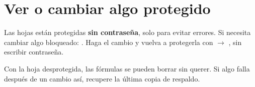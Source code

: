 \section{Ver o cambiar algo protegido}
Las hojas están protegidas \textbf{sin contraseña}, solo para evitar errores. Si necesita cambiar algo bloqueado:
. Haga el cambio y vuelva a protegerla con 
$\rightarrow$ , sin escribir contraseña.

\begin{atencion}
Con la hoja desprotegida, las fórmulas se pueden borrar sin querer. Si algo falla después de un cambio así, recupere la última copia de respaldo.
\end{atencion}

